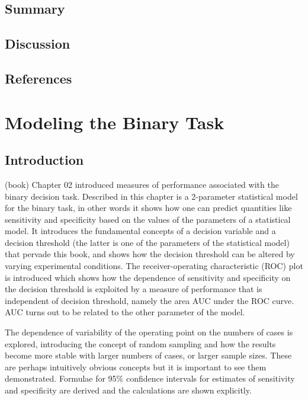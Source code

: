 \documentclass[
]{book}
\begin{document}
\hypertarget{binaryTask0-Summary}{%
\section{Summary}\label{binaryTask0-Summary}}

\hypertarget{binaryTask0-Discussion}{%
\section{Discussion}\label{binaryTask0-Discussion}}

\hypertarget{binaryTask0-references}{%
\section{References}\label{binaryTask0-references}}

\hypertarget{binaryTask}{%
\chapter{Modeling the Binary Task}\label{binaryTask}}

\hypertarget{binaryTaskIntro}{%
\section{Introduction}\label{binaryTaskIntro}}

(book) Chapter 02 introduced measures of performance associated with the binary decision task. Described in this chapter is a 2-parameter statistical model for the binary task, in other words it shows how one can predict quantities like sensitivity and specificity based on the values of the parameters of a statistical model. It introduces the fundamental concepts of a decision variable and a decision threshold (the latter is one of the parameters of the statistical model) that pervade this book, and shows how the decision threshold can be altered by varying experimental conditions. The receiver-operating characteristic (ROC) plot is introduced which shows how the dependence of sensitivity and specificity on the decision threshold is exploited by a measure of performance that is independent of decision threshold, namely the area AUC under the ROC curve. AUC turns out to be related to the other parameter of the model.

The dependence of variability of the operating point on the numbers of cases is explored, introducing the concept of random sampling and how the results become more stable with larger numbers of cases, or larger sample sizes. These are perhaps intuitively obvious concepts but it is important to see them demonstrated. Formulae for 95\% confidence intervals for estimates of sensitivity and specificity are derived and the calculations are shown explicitly.
\end{document}
